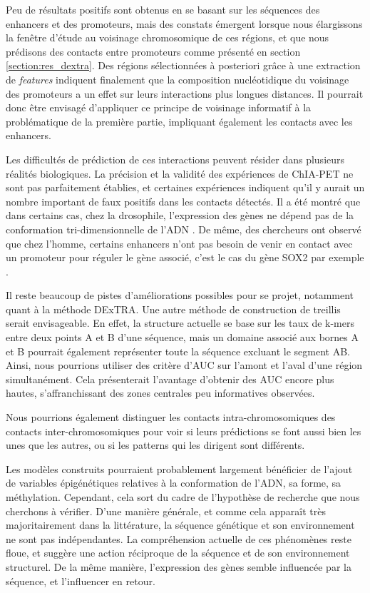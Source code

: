\documentclass[french]{llncs}
\begin{document}
Peu de résultats positifs sont obtenus en se basant sur les séquences des enhancers et des promoteurs, mais des constats émergent lorsque nous élargissons la fenêtre d'étude au voisinage chromosomique de ces régions, et que nous prédisons des contacts entre promoteurs comme présenté en section \ref{section:res_dextra}. Des régions sélectionnées à posteriori grâce à une extraction de \textit{features} indiquent finalement que la composition nucléotidique du voisinage des promoteurs a un effet sur leurs interactions plus longues distances. Il pourrait donc être envisagé d'appliquer ce principe de voisinage informatif à la problématique de la première partie, impliquant également les contacts avec les enhancers.

Les difficultés de prédiction de ces interactions peuvent résider dans plusieurs réalités biologiques. La précision et la validité des expériences de ChIA-PET ne sont pas parfaitement établies, et certaines expériences indiquent qu'il y aurait un nombre important de faux positifs dans les contacts détectés. 
 Il a été montré que dans certains cas, chez la drosophile, l'expression des gènes ne dépend pas de la conformation tri-dimensionnelle de l'ADN \cite{ghavi-helm_highly_2019}. De même, des chercheurs ont observé que chez l'homme, certains enhancers n'ont pas besoin de venir en contact avec un promoteur pour réguler le gène associé, c'est le cas du gène SOX2 par exemple \cite{alexander_live-cell_2019}.

Il reste beaucoup de pistes d'améliorations possibles pour se projet, notamment quant à la méthode DExTRA. Une autre méthode de construction de treillis serait envisageable. En effet, la structure actuelle se base sur les taux de k-mers entre deux points A et B d'une séquence, mais un domaine associé aux bornes A et B pourrait également représenter toute la séquence excluant le segment AB. Ainsi, nous pourrions utiliser des critère d'AUC sur l'amont et l'aval d'une région simultanément. Cela présenterait l'avantage d'obtenir des AUC encore plus hautes, s'affranchissant des zones centrales peu informatives observées.

Nous pourrions également distinguer les contacts intra-chromosomiques des contacts inter-chromosomiques pour voir si leurs prédictions se font aussi bien les unes que les autres, ou si les patterns qui les dirigent sont différents.

Les modèles construits pourraient probablement largement bénéficier de l'ajout de variables épigénétiques relatives à la conformation de l'ADN, sa forme, sa méthylation. Cependant, cela sort du cadre de l'hypothèse de recherche que nous cherchons à vérifier. D'une manière générale, et comme cela apparaît très majoritairement dans la littérature, la séquence génétique et son environnement ne sont pas indépendantes. La compréhension actuelle de ces phénomènes reste floue, et suggère une action réciproque de la séquence et de son environnement structurel. De la même manière, l'expression des gènes semble influencée par la séquence, et l'influencer en retour.
\end{document}
